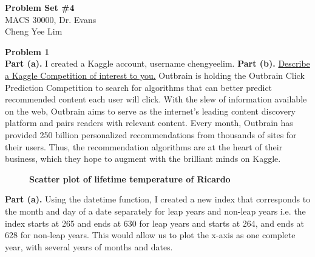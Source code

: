 \documentclass[letterpaper,12pt]{article}
\theoremstyle{definition}
\begin{document}
\begin{flushleft}
  \textbf{\large{Problem Set \#4}} \\
  MACS 30000, Dr. Evans \\
  Cheng Yee Lim
\end{flushleft}

\vspace{5mm}

\noindent\textbf{Problem 1}\\
\flushleft
\textbf{Part (a).}
I created a Kaggle account, username chengyeelim. 
\flushleft
\textbf{Part (b).}
\underline {Describe a Kaggle Competition of interest to you.} 
Outbrain is holding the Outbrain Click Prediction Competition to search for algorithms that can better predict recommended content each user will click. With the slew of information available on the web, Outbrain aims to serve as the internet’s leading content discovery platform and pairs readers with relevant content. Every month, Outbrain has provided 250 billion personalized recommendations from thousands of sites for their users. Thus, the recommendation algorithms are at the heart of their business, which they hope to augment with the brilliant minds on Kaggle. 


\begin{figure}[htb]\centering\captionsetup{width=4.0in}
  \caption{\textbf{Scatter plot of lifetime temperature of Ricardo}}\label{FigExample}
\end{figure}
\flushleft
\textbf{Part (a).}
\flushleft Using the datetime function, I created a new index that corresponds to the month and day of a date separately for leap years and non-leap years i.e. the index starts at 265 and ends at 630 for leap years and starts at 264, and ends at 628 for non-leap years. This would allow us to plot the x-axis as one complete year, with several years of months and dates.
\flushleft
\end{document}
